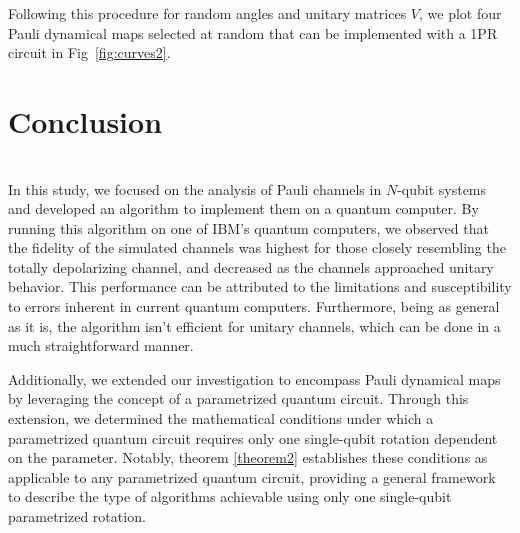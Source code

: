 \documentclass[10pt,letterpaper]{article} %
\newcommand{\fref}[1]{Fig~\ref{#1}}
\begin{document}
Following this procedure for random
angles and unitary matrices $V$, 
we plot four Pauli dynamical maps  selected at random
that can be implemented with a 1PR circuit in \fref{fig:curves2}.

\section{Conclusion} %
\\


In this study, we focused on the analysis of Pauli channels in $N$-qubit systems and
developed an algorithm to implement them on a quantum computer.
 By running this algorithm on one of IBM's quantum computers, 
we observed that the fidelity of the simulated channels was highest for those 
closely resembling the totally depolarizing channel, 
and decreased as the channels approached unitary behavior. 
This performance can be attributed to the limitations and susceptibility to errors 
inherent in current quantum computers. 
Furthermore, being as general as it is,
the algorithm isn’t efficient for unitary channels, 
which can be done in a much straightforward manner.

Additionally, we extended our investigation 
to encompass Pauli dynamical maps by leveraging the concept of a parametrized quantum circuit. 
Through this extension, we determined the mathematical conditions under which a
parametrized quantum circuit requires only one single-qubit 
rotation dependent on the parameter. Notably, theorem \ref{theorem2} establishes these
 conditions as applicable to any parametrized quantum circuit, 
 providing a general framework to describe the type of algorithms achievable using 
only one single-qubit parametrized rotation.




\end{document}
